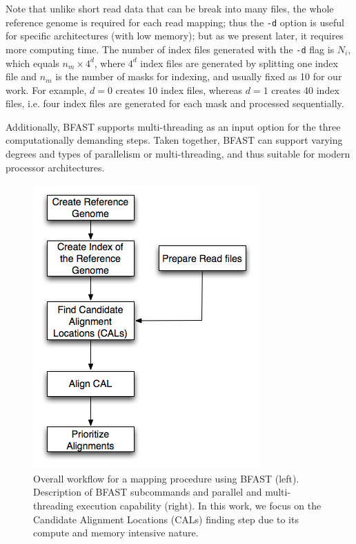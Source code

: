 \documentclass{cpeauth}
\begin{document}
Note that unlike short read data that can be break into many files, the whole reference genome is required for each read mapping;
thus the \texttt{-d} option is useful for specific architectures (with
low memory); but as we present later, it requires more computing time.  The number of index files
generated with the \texttt{-d} flag is $N_i$, which equals $n_m \times
4^d$, where $4^d$ index files are generated by splitting one index file and
$n_m$ is the number of masks for indexing, and usually fixed as 10 for
our work.  For example, $d=0$ creates 10 index files, whereas $d=1$
creates 40 index files, i.e. four index files are generated for each mask
and processed sequentially.  

Additionally, BFAST supports multi-threading as an input option for
the three computationally demanding steps.  Taken together, BFAST can
support varying degrees and types of parallelism or multi-threading,
and thus suitable for modern processor architectures.




\begin{figure}
\includegraphics[scale=0.41]{figures/workflow.png} 
\caption{\small Overall workflow for a mapping procedure using BFAST
    (left). Description of BFAST subcommands and parallel and
    multi-threading execution capability (right).  In this work, we
    focus on the Candidate Alignment Locations (CALs) finding step due
    to its compute and memory intensive nature.}
\label{fig:bfast-summary}
\end{figure}
\end{document}
